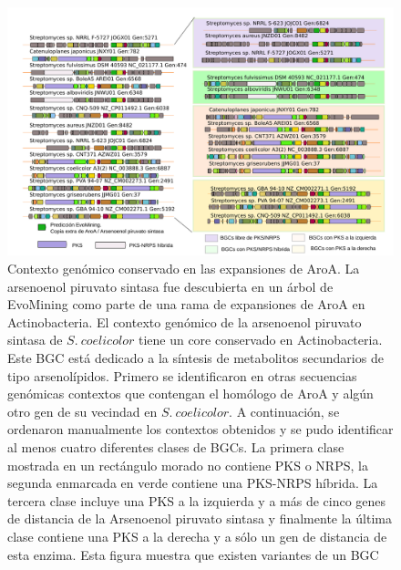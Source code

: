 \documentclass[12pt,twoside]{reedthesis}
\begin{document}
  \begin{figure}[h!tbp]
  \centering
  \includegraphics[angle = 0,scale = .4]{chapter3/Coelicolor.pdf}
  \caption[EvoMining Algorithm]{\footnotesize{Contexto genómico conservado en las expansiones de AroA. La arsenoenol piruvato sintasa fue descubierta en un árbol de EvoMining como parte de una rama de expansiones de AroA en Actinobacteria. El contexto genómico de la arsenoenol piruvato sintasa de $S.~coelicolor$ tiene un core conservado en Actinobacteria. Este BGC está dedicado a la síntesis de metabolitos secundarios de tipo arsenolípidos. Primero se identificaron en otras secuencias genómicas contextos que contengan el homólogo de AroA y algún otro gen de su vecindad en $S.~coelicolor$. A continuación, se ordenaron manualmente los contextos obtenidos y se pudo identificar al menos cuatro diferentes clases de BGCs. La primera clase mostrada en un rectángulo morado no contiene PKS o NRPS, la segunda enmarcada en verde contiene una PKS-NRPS híbrida. La tercera clase incluye una PKS a la izquierda y a más de cinco genes de distancia de la Arsenoenol piruvato sintasa y finalmente la última clase contiene una PKS a la derecha y a sólo un gen de distancia de esta enzima. Esta figura muestra que existen variantes de un BGC }}
  \label{fig:Coelicolor}
  \end{figure}
  
\end{document}
